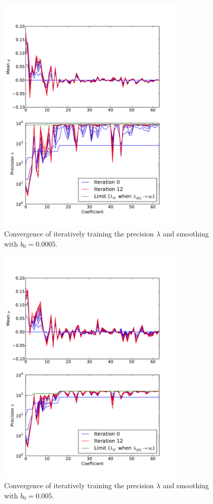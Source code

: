\documentclass{article}
\begin{document}
\begin{figure}
    \centering
    \includegraphics[width=0.8\textwidth]{figs/p1.pdf}
    \caption{Convergence of iteratively training the precision $\lambda$ and smoothing with $b_0 = 0.0005$.} \label{fig:iter1}
\end{figure}

\begin{figure}
    \centering
    \includegraphics[width=0.8\textwidth]{figs/p2.pdf}
    \caption{Convergence of iteratively training the precision $\lambda$ and smoothing with $b_0 = 0.005$.} \label{fig:iter2}
\end{figure}
\end{document}
